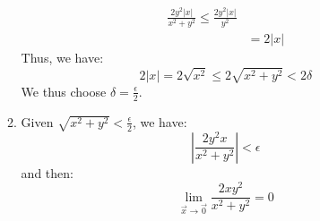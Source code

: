 \begin{itemize}
\begin{example}
\begin{enumerate}
\begin{align}
                \frac{2y^2|x|}{x^2+y^2} \le \frac{2y^2|x|}{y^2} \\ 
                &= 2|x|
            \end{align}
            Thus, we have:
            \begin{equation}
                2|x| = 2\sqrt{x^2} \le 2\sqrt{x^2+y^2} < 2\delta
            \end{equation}
            We thus choose $\delta = \frac{\epsilon}{2}$.
            \item Given $\sqrt{x^2+y^2}<\frac{\epsilon}{2}$, we have:
            \begin{equation}
                \left|\frac{2y^2x}{x^2+y^2}\right| < \epsilon
            \end{equation}
            and then:
            \begin{equation}
                \lim_{\vec{x}\to\vec{0}} \frac{2xy^2}{x^2+y^2}=0
            \end{equation}            
        \end{enumerate}
    \end{example}
\end{itemize}